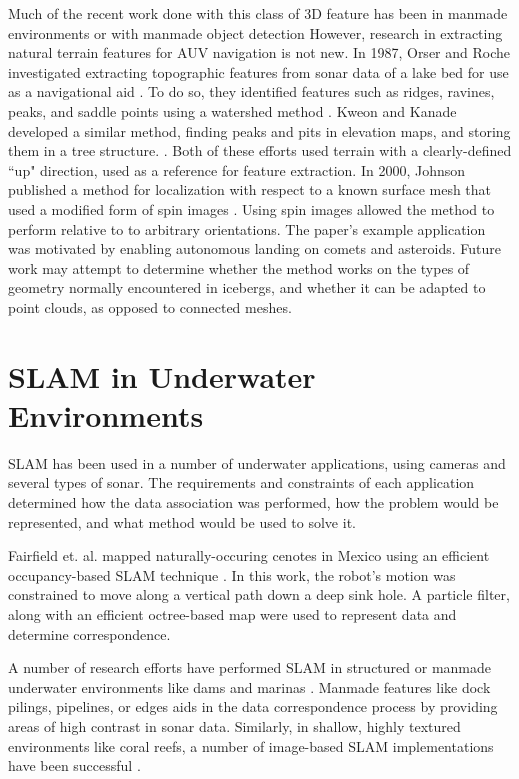 Much of the recent work done with this class of 3D feature has been in manmade environments or with manmade object detection \cite{Rusu2008,Rusu2011,Koppula2011} However, research in extracting natural terrain features for AUV navigation is not new. In 1987, Orser and Roche investigated extracting topographic features from sonar data of a lake bed for use as a navigational aid \cite{Orser1987}. To do so, they identified features such as ridges, ravines, peaks, and saddle points using a watershed method \cite{Sonka2014}. Kweon and Kanade developed a similar method, finding peaks and pits in elevation maps, and storing them in a tree structure. \cite{Kweon1994}. Both of these efforts used terrain with a clearly-defined ``up" direction, used as a reference for feature extraction. In 2000, Johnson published a method for localization with respect to a known surface mesh that used a modified form of spin images \cite{Johnson1999,Johnson2000}. Using spin images allowed the method to perform relative to to arbitrary orientations. The paper's example application was motivated by enabling autonomous landing on comets and asteroids. Future work may attempt to determine whether the method works on the types of geometry normally encountered in icebergs, and whether it can be adapted to point clouds, as opposed to connected meshes. 



\section{SLAM in Underwater Environments}


SLAM has been used in a number of underwater applications, using cameras and several types of sonar. The requirements and constraints of each application determined how the data association was performed, how the problem would be represented, and what method would be used to solve it.

Fairfield et. al. mapped naturally-occuring cenotes in Mexico using an efficient occupancy-based SLAM technique \cite{Fairfield2007}. In this work, the robot's motion was constrained to move along a vertical path down a deep sink hole. A particle filter, along with an efficient octree-based map were used to represent data and determine correspondence.

A number of research efforts have performed SLAM in structured or manmade underwater environments like dams and marinas \cite{Ribas2008}. Manmade features like dock pilings, pipelines, or edges aids in the data correspondence process by providing areas of high contrast in sonar data. Similarly, in shallow, highly textured environments like coral reefs, a number of image-based SLAM implementations have been successful \cite{Eustice2005}.

